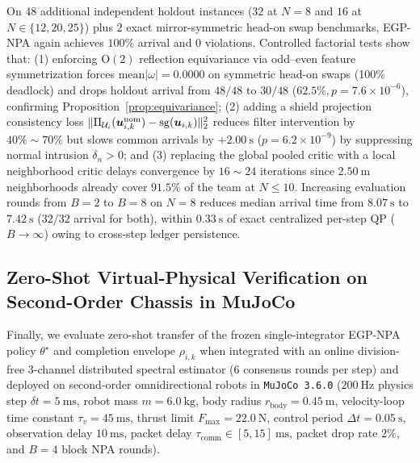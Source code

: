 On $48$ additional independent holdout instances ($32$ at $N=8$ and $16$ at $N\in\{12,20,25\}$) plus $2$ exact mirror-symmetric head-on swap benchmarks, EGP-NPA again achieves $100\%$ arrival and $0$ violations. Controlled factorial tests show that: (1) enforcing $\mathrm{O}(2)$ reflection equivariance via odd--even feature symmetrization forces $\mathrm{mean}|\omega|=0.0000$ on symmetric head-on swaps (100\% deadlock) and drops holdout arrival from $48/48$ to $30/48$ ($62.5\%,p=7.6\times 10^{-6}$), confirming Proposition~\ref{prop:equivariance}; (2) adding a shield projection consistency loss $\lVert\Pi_{\mathcal U_i}(\boldsymbol{u}_{i,k}^{\mathrm{nom}})-\operatorname{sg}(\boldsymbol{u}_{i,k})\rVert_2^2$ reduces filter intervention by $40\%\sim 70\%$ but slows common arrivals by $+2.00\ \mathrm s$ ($p=6.2\times 10^{-9}$) by suppressing normal intrusion $\delta_n>0$; and (3) replacing the global pooled critic with a local neighborhood critic delays convergence by $16\sim 24$ iterations since $2.50\ \mathrm m$ neighborhoods already cover $91.5\%$ of the team at $N\le 10$. Increasing evaluation rounds from $B=2$ to $B=8$ on $N=8$ reduces median arrival time from $8.07\ \mathrm s$ to $7.42\ \mathrm s$ ($32/32$ arrival for both), within $0.33\ \mathrm s$ of exact centralized per-step QP ($B\to\infty$) owing to cross-step ledger persistence.

\subsection{Zero-Shot Virtual-Physical Verification on Second-Order Chassis in MuJoCo}\label{subsec:mujoco}
Finally, we evaluate zero-shot transfer of the frozen single-integrator EGP-NPA policy $\theta^\star$ and completion envelope $\rho_{i,k}$ when integrated with an online division-free 3-channel distributed spectral estimator ($6$ consensus rounds per step) and deployed on second-order omnidirectional robots in \texttt{MuJoCo 3.6.0} ($200\ \mathrm{Hz}$ physics step $\delta t=5\ \mathrm{ms}$, robot mass $m=6.0\ \mathrm{kg}$, body radius $r_{\mathrm{body}}=0.45\ \mathrm m$, velocity-loop time constant $\tau_v=45\ \mathrm{ms}$, thrust limit $F_{\max}=22.0\ \mathrm N$, control period $\Delta t=0.05\ \mathrm s$, observation delay $10\ \mathrm{ms}$, packet delay $\tau_{\mathrm{comm}}\in[5,15]\ \mathrm{ms}$, packet drop rate $2\%$, and $B=4$ block NPA rounds).

